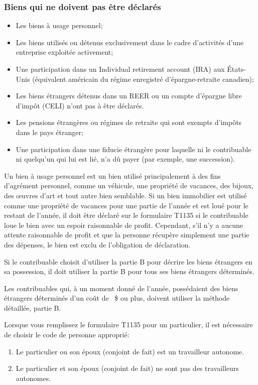 \subsubsection{Biens qui ne doivent pas être déclarés}
\begin{itemize}
	\item Les biens à usage personnel;
	\item Les biens utilisés ou détenus exclusivement dans le cadre d'activités d'une entreprise exploitée activement;
	\item Une participation dans un \og Individual retirement account (IRA)\fg{} aux États-Unis (équivalent américain du régime enregistré d'épargne-retraite canadien);
	\item Les biens étrangers détenus dans un REER ou un compte d'épargne libre d'impôt (CELI) n'ont pas à être déclarés.
	\item Les pensions étrangères ou régimes de retraite qui sont exempts d'impôts dans le pays étranger;
	\item Une participation dans une fiducie étrangère pour laquelle ni le contribuable ni quelqu'un qui lui est lié, n'a dû payer (par exemple, une succession).
\end{itemize}

Un bien à usage personnel est un bien utilisé principalement à des fins d'agrément personnel, comme un véhicule, une propriété de vacances, des bijoux, des œuvres d'art et tout autre bien semblable. Si un bien immobilier est utilisé comme une propriété de vacances pour une partie de l'année et est loué pour le restant de l'année, il doit être déclaré sur le formulaire T1135 si le contribuable loue le bien avec un espoir raisonnable de profit. Cependant, s'il n'y a aucune attente raisonnable de profit et que la personne récupère simplement une partie des dépenses, le bien est exclu de l'obligation de déclaration.

\begin{note}
	Si le contribuable choisit d'utiliser la partie B pour décrire les biens étrangers en sa possession, il doit utiliser la partie B pour tous ses biens étrangers déterminés.
\end{note}

Les contribuables qui, à un moment donné de l'année, possédaient des biens étrangers déterminés d'un coût de ~\$    ou plus, doivent utiliser la méthode détaillée, partie B.

\begin{note}
	Lorsque vous remplissez le formulaire T1135 pour un particulier, il est nécessaire de choisir le code de personne approprié:
	\begin{enumerate}
		\item Le particulier ou son époux (conjoint de fait) est un travailleur autonome.
		\item Le particulier et son époux (conjoint de fait) ne sont pas des travailleurs autonomes.
	\end{enumerate}
\end{note}


